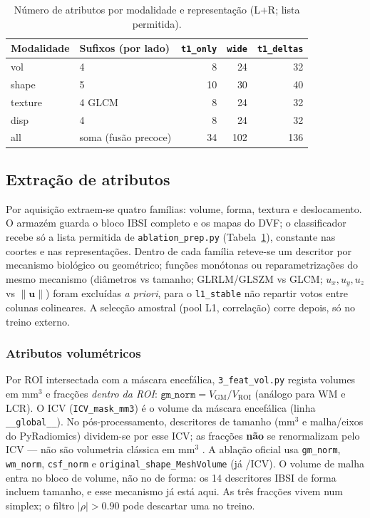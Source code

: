 \documentclass[review]{elsarticle}
\newcommand{\code}[1]{\texttt{#1}}
\begin{document}
	\begin{table}[htbp]
		\centering
		\caption{Número de atributos por modalidade e representação (L$+$R; lista permitida).}
		\label{tab:dims}
		\begin{tabular}{llrrr}
			\toprule
			Modalidade & Sufixos (por lado) & \code{t1\_only} & \code{wide} & \code{t1\_deltas} \\
			\midrule
			vol     & 4 & 8  & 24  & 32 \\
			shape   & 5 & 10 & 30  & 40 \\
			texture & 4 GLCM & 8  & 24  & 32 \\
			disp    & 4 & 8 & 24 & 32 \\
			all     & soma (fusão precoce) & 34 & 102 & 136 \\
			\bottomrule
		\end{tabular}
	\end{table}
	
	\subsection{Extração de atributos}\label{sec:feature-extraction}
	
	Por aquisição extraem-se quatro famílias: volume, forma, textura e deslocamento.
	O armazém guarda o bloco IBSI completo e os mapas do DVF; o classificador recebe só a lista permitida de \code{ablation\_prep.py} (Tabela~\ref{tab:dims}), constante nas coortes e nas representações.
	Dentro de cada família reteve-se um descritor por mecanismo biológico ou geométrico; funções monótonas ou reparametrizações do mesmo mecanismo (diâmetros vs tamanho; GLRLM/GLSZM vs GLCM; $u_x,u_y,u_z$ vs $\|\mathbf{u}\|$) foram excluídas \emph{a priori}, para o \code{l1\_stable} não repartir votos entre colunas colineares.
	A selecção amostral (pool L1, correlação) corre depois, só no treino externo.
	
	\subsubsection{Atributos volumétricos}
	
	Por ROI intersectada com a máscara encefálica, \code{3\_feat\_vol.py} regista volumes em mm$^3$ e fracções \emph{dentro da ROI}: $\mathtt{gm\_norm}=V_{\mathrm{GM}}/V_{\mathrm{ROI}}$ (análogo para WM e LCR).
	O ICV (\code{ICV\_mask\_mm3}) é o volume da máscara encefálica (linha \code{\_\_global\_\_}).
	No pós-processamento, descritores de tamanho (mm$^3$ e malha/eixos do PyRadiomics) dividem-se por esse ICV; as fracções \textbf{não} se renormalizam pelo ICV --- não são volumetria clássica em mm$^3$ \cite{wyman-2013}.
	A ablação oficial usa \code{gm\_norm}, \code{wm\_norm}, \code{csf\_norm} e \code{original\_shape\_MeshVolume} (já /ICV).
	O volume de malha entra no bloco de volume, não no de forma: os 14 descritores IBSI de forma incluem tamanho, e esse mecanismo já está aqui.
	As três fracções vivem num simplex; o filtro $|\rho|>0.90$ pode descartar uma no treino.
	
\end{document}
